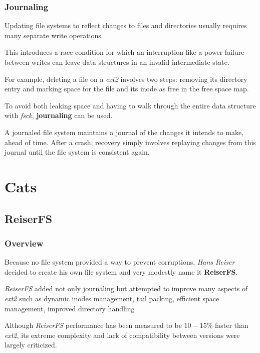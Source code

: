 \begin{frame}
  \frametitle{Journaling}

  Updating file systems to reflect changes to files and directories usually
  requires many separate write operations.

  \-

  This introduces a race condition for which an interruption like a power
  failure between writes can leave data structures in an invalid intermediate
  state.

  \-

  For example, deleting a file on a \textit{ext2} involves two steps: removing
  its directory entry and marking space for the file and its inode as free in
  the free space map.

  \-

  To avoid both leaking space and having to walk through the entire data
  structure with \textit{fsck}, \textbf{journaling} can be used.

  \-

  A journaled file system maintains a journal of the changes it intends to
  make, ahead of time. After a crash, recovery simply involves replaying
  changes from this journal until the file system is consistent again.
\end{frame}

%
%

\section{Cats}


\subsection{ReiserFS}


\begin{frame}
  \frametitle{Overview}

  Because no file system provided a way to prevent corruptions, \textit{Hans
  Reiser} decided to create his own file system and very modestly name
  it \textbf{ReiserFS}.

  \-

  \textit{ReiserFS} added not only journaling but attempted to improve
  many aspects of \textit{ext2} such as dynamic inodes management, tail
  packing, efficient space management, improved directory handling \etc{}

  \-

  Although \textit{ReiserFS} performance has been measured to be $10-15\%$
  faster than \textit{ext2}, its extreme complexity and lack of compatibility
  between versions were largely criticized.
\end{frame}

